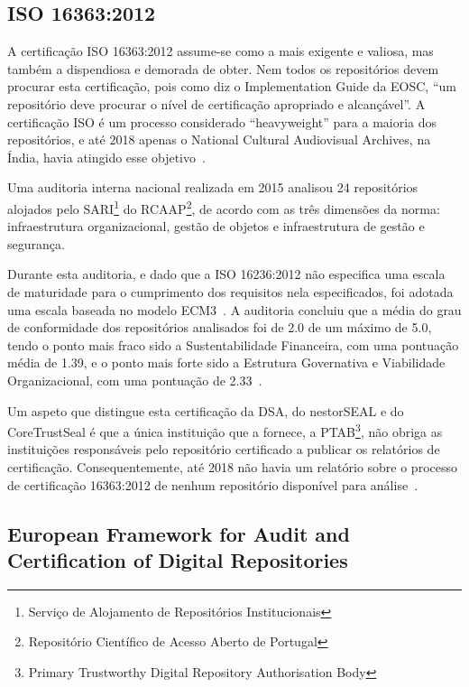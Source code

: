 \documentclass[sigconf,nonacm]{acmart}
\begin{document}

\subsection{ISO 16363:2012} %
\label{sub:iso_16363_2012}

A certificação ISO 16363:2012 assume-se como a mais exigente e valiosa, mas também a dispendiosa e demorada de obter. Nem todos os repositórios devem procurar esta certificação, pois como diz o Implementation Guide da EOSC, ``um repositório deve procurar o nível de certificação apropriado e alcançável''\cite{hodson2018turning}. A certificação ISO é um processo considerado ``heavyweight'' para a maioria dos repositórios, e até 2018 apenas o National Cultural Audiovisual Archives, na Índia, havia atingido esse objetivo~\cite{Lindlar_Schwab_2019,IndianMinistryofCulture2017}.

Uma auditoria interna nacional realizada em 2015 analisou 24 repositórios alojados pelo SARI\footnote{Serviço de Alojamento de Repositórios Institucionais} do RCAAP\footnote{Repositório Científico de Acesso Aberto de Portugal}, de acordo com as três dimensões da norma: infraestrutura organizacional, gestão de objetos e infraestrutura de gestão e segurança. 

Durante esta auditoria, e dado que a ISO 16236:2012 não especifica uma escala de maturidade para o cumprimento dos requisitos nela especificados, foi adotada uma escala baseada no modelo ECM3~\cite{Katuu2013}. A auditoria concluiu que a média do grau de conformidade dos repositórios analisados foi de 2.0 de um máximo de 5.0, tendo o ponto mais fraco sido a Sustentabilidade Financeira, com uma pontuação média de 1.39, e o ponto mais forte sido a Estrutura Governativa e Viabilidade Organizacional, com uma pontuação de 2.33~\cite{Carvalho2014}. 

Um aspeto que distingue esta certificação da DSA, do nestorSEAL e do CoreTrustSeal é que a única instituição que a fornece, a PTAB\footnote{Primary Trustworthy Digital Repository Authorisation Body}, não obriga as instituições responsáveis pelo repositório certificado a publicar os relatórios de certificação. Consequentemente, até 2018 não havia um relatório sobre o processo de certificação 16363:2012 de nenhum repositório disponível para análise~\cite{Lindlar_Schwab_2019}. 


\subsection{European Framework for Audit and Certification of Digital Repositories} %
\label{sub:european_framework_for_audit_and_certification_of_digital_repositories}
\end{document}
